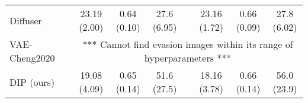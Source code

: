 \begin{table*}[!tb]
{\begin{tabular}{l c ccc c ccc}
\rowcolor{Gray}
\small{Diffuser} & & \small{23.19 \small{(2.00)}} & \small{0.64 \small{(0.10)}} & \small{27.6 \small{(6.95)}} & & \small{23.16 \small{(1.72)}} & \small{0.66 \small{(0.09)}} & \small{27.8 \small{(6.02)}}\\
\rowcolor{Gray}
\small{VAE-Cheng2020} & & \multicolumn{7}{c}{*** Cannot find evasion images within its range of hyperparameters ***}\\
\hdashline
\rowcolor{Gray}
\small{DIP (ours)} & & \small{19.08 \small{(4.09)}} & \small{0.65 \small{(0.14)}} & \small{51.6 \small{(27.5)}} & & \small{18.16 \small{(3.78)}} & \small{0.66 \small{(0.14)}} & \small{56.0 \small{(23.9)}}
\\
\toprule
\end{tabular}}
\vspace{-1em}
\end{table*}%